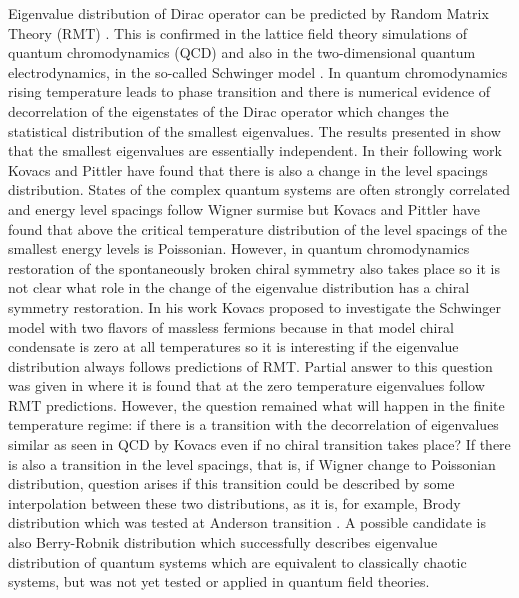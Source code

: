 \documentclass[12pt,a4paper]{article}
\begin{document}
Eigenvalue distribution of Dirac operator can be predicted by Random Matrix Theory (RMT) \cite{Akemann:96}. This is confirmed in the lattice field theory simulations of quantum chromodynamics (QCD) \cite{Verbaarschot:00} and also in the two-dimensional quantum electrodynamics, in the so-called Schwinger model \cite{Farchioni:98,Bietenholz:11,Landa-Marban:13}. In quantum chromodynamics rising temperature leads to phase transition and there is numerical evidence of decorrelation of the eigenstates of the Dirac operator \cite{Kovacs:09} which changes the statistical distribution of the smallest eigenvalues. The results presented in \cite{Kovacs:09} show that the smallest eigenvalues are essentially independent. In their following work \cite{Kovacs:12} Kovacs and Pittler have found that there is also a change in the level spacings distribution. States of the complex quantum systems are often strongly correlated and energy level spacings follow Wigner surmise but Kovacs and Pittler have found that above the critical temperature distribution of the level spacings of the smallest energy levels is Poissonian. However, in quantum chromodynamics restoration of the spontaneously broken chiral symmetry also takes place so it is not clear what role in the change of the eigenvalue distribution has a chiral symmetry restoration. In his work \cite{Kovacs:09} Kovacs 
proposed to investigate the Schwinger model with two flavors of massless fermions because in that model chiral condensate is zero at all temperatures so it is interesting if the eigenvalue distribution always follows predictions of RMT. Partial answer to this question was given in \cite{Bietenholz:11,Landa-Marban:13} where it is found that at the zero temperature eigenvalues follow RMT predictions. However, the question remained what will happen in the finite temperature regime: if there is a transition with the decorrelation of eigenvalues similar as seen in QCD by Kovacs \cite{Kovacs:09} even if no chiral transition takes place? If there is also a transition in the level spacings, that is, if Wigner change to Poissonian distribution, question arises if this transition could be described by some interpolation between these two distributions, as it is, for example, Brody distribution which was tested at Anderson transition \cite{Varga:95}. A possible candidate is also Berry-Robnik distribution \cite{Berry:84} which successfully describes eigenvalue distribution of quantum systems which are equivalent to classically chaotic systems, but was not yet tested or applied in quantum field theories.
\end{document}
